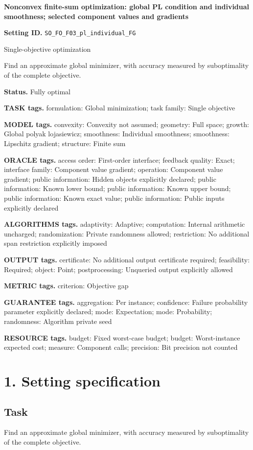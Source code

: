 \documentclass[10pt,a4paper]{article}
\begin{document}
\raggedright

{\LARGE\bfseries\sffamily\color{AtlasNavy} Nonconvex finite-sum optimization: global PL condition and individual smoothness; selected component values and gradients\par}\vspace{5pt}
\textbf{Setting ID.} \texttt{SO\_\allowbreak{}FO\_\allowbreak{}F03\_\allowbreak{}pl\_\allowbreak{}individual\_\allowbreak{}FG}

Single-objective optimization

Find an approximate global minimizer, with accuracy measured by suboptimality of the complete objective.

\textbf{Status.} Fully optimal

\textbf{TASK tags.} formulation: Global minimization; task family: Single objective

\textbf{MODEL tags.} convexity: Convexity not assumed; geometry: Full space; growth: Global polyak lojasiewicz; smoothness: Individual smoothness; smoothness: Lipschitz gradient; structure: Finite sum

\textbf{ORACLE tags.} access order: First-order interface; feedback quality: Exact; interface family: Component value gradient; operation: Component value gradient; public information: Hidden objects explicitly declared; public information: Known lower bound; public information: Known upper bound; public information: Known exact value; public information: Public inputs explicitly declared

\textbf{ALGORITHMS tags.} adaptivity: Adaptive; computation: Internal arithmetic uncharged; randomization: Private randomness allowed; restriction: No additional span restriction explicitly imposed

\textbf{OUTPUT tags.} certificate: No additional output certificate required; feasibility: Required; object: Point; postprocessing: Unqueried output explicitly allowed

\textbf{METRIC tags.} criterion: Objective gap

\textbf{GUARANTEE tags.} aggregation: Per instance; confidence: Failure probability parameter explicitly declared; mode: Expectation; mode: Probability; randomness: Algorithm private seed

\textbf{RESOURCE tags.} budget: Fixed worst-case budget; budget: Worst-instance expected cost; measure: Component calls; precision: Bit precision not counted

\section{1. Setting specification}
\subsection{Task}
Find an approximate global minimizer, with accuracy measured by suboptimality of the complete objective.
\end{document}
